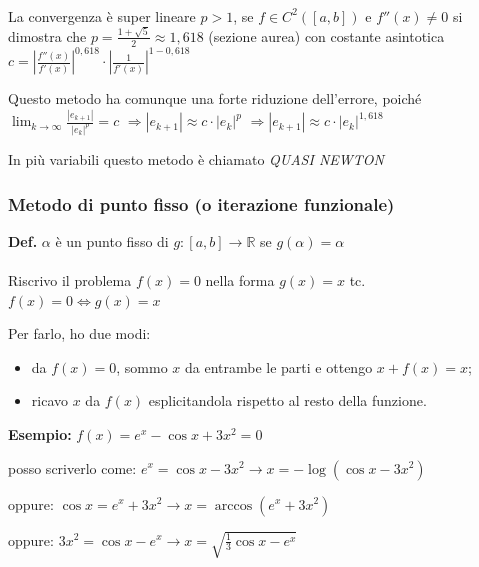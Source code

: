 \documentclass[a4paper, 11pt]{article}
\begin{document}
        \paragraph{}
        La convergenza è super lineare $p > 1$, se $f \in C^2([a, b])$ e $f''(x) \neq 0$ si dimostra che $p = \frac{1 + \sqrt{5}}{2} \approx 1,618$ (sezione aurea) con costante asintotica $c = \left| \frac{f''(x)}{f'(x)} \right|^{0,618} \cdot \left| \frac{1}{f'(x)} \right|^{1 - 0,618}$

       
        Questo metodo ha comunque una forte riduzione dell'errore, poiché $\lim_{k \to \infty} \frac{|e_{k+1}|}{|e_k|^p} = c$ \quad $\Rightarrow |e_{k+1}| \approx c \cdot |e_k|^p$ \quad $\Rightarrow |e_{k+1}| \approx c \cdot |e_k|^{1,618}$
        
        In più variabili questo metodo è chiamato \textit{QUASI NEWTON}

        \subsubsection{Metodo di punto fisso (o iterazione funzionale)}

        \textbf{Def.} $\alpha$ è un punto fisso di $g: [a, b] \rightarrow \mathbb{R}$ se $g(\alpha) = \alpha$

        \paragraph{}
        Riscrivo il problema $f(x) = 0$ nella forma $g(x) = x$ tc. $f(x) = 0 \iff g(x) = x$

        Per farlo, ho due modi:

        \begin{itemize}
            \item da $f(x) = 0$, sommo $x$ da entrambe le parti e ottengo $x + f(x) = x$;
            \item ricavo $x$ da $f(x)$ esplicitandola rispetto al resto della funzione.
        \end{itemize}

        \textbf{Esempio: } $f(x) = e^x - \cos x + 3x^2 = 0$ 
        
        posso scriverlo come: $e^x = \cos x - 3x^2 \rightarrow x = -\log(\cos x - 3x^2)$

        oppure: $\cos x = e^x + 3x^2 \rightarrow x = \arccos(e^x + 3x^2)$
        
        oppure: $3x^2 = \cos x - e^x \rightarrow x = \sqrt{\frac{1}{3} \cos x - e^x}$
\end{document}
